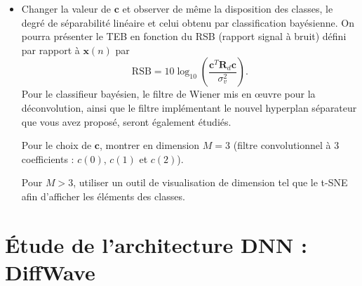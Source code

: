 \documentclass[11pt,a4paper]{article}
\newcommand{\xv}{\mathbf{x}}
\newcommand{\cv}{\mathbf{c}}
\begin{document}
\begin{enumerate}[label=\arabic*.]
\begin{itemize}
    \item Changer la valeur de $\cv$ et observer de même la disposition
    des classes, le degré de séparabilité linéaire et celui obtenu par
    classification bayésienne. On pourra présenter le TEB en fonction
    du RSB (rapport signal à bruit) défini par rapport à $\xv(n)$ par
    \[
        \mathrm{RSB}
        =
        10\log_{10}
        \left(
        \frac{\cv^{T}\mathbf{R}_{d}\cv}{\sigma_v^2}
        \right).
    \]
    Pour le classifieur bayésien, le filtre de Wiener mis en œuvre pour
    la déconvolution, ainsi que le filtre implémentant le nouvel
    hyperplan séparateur que vous avez proposé, seront également étudiés.

    Pour le choix de $\cv$, montrer en dimension $M=3$ (filtre
    convolutionnel à 3 coefficients : $c(0)$, $c(1)$ et $c(2)$).

    Pour $M>3$, utiliser un outil de visualisation de dimension tel que
    le t-SNE afin d'afficher les éléments des classes.
\end{itemize}

\end{enumerate}

\section{Étude de l'architecture DNN : DiffWave}
\end{document}
